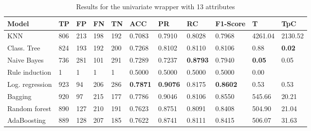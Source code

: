 \documentclass[a4paper,11pt]{article}
\begin{document}
\begin{table}
\centering
\begin{tabular}{|l|l|l|l|l|l|l|l|l|l|l|}
\hline

\textbf{Model} & \textbf{TP} & \textbf{FP} & \textbf{FN} & \textbf{TN} & \textbf{ACC} & \textbf{PR} & \textbf{RC} & \textbf{F1-Score} & \textbf{T} & \textbf{TpC} \\ \hline
KNN & 806 & 213 & 198 & 192 & 0.7083 & 0.7910 & 0.8028 & 0.7968 & 4261.04 & 2130.52 \\ \hline
Class. Tree & 824 & 193 & 192 & 200 & 0.7268 & 0.8102 & 0.8110 & 0.8106 & 0.88 & \textbf{0.02} \\ \hline
Naive Bayes & 736 & 281 & 101 & 291 & 0.7289 & 0.7237 & \textbf{0.8793} & 0.7940 & \textbf{0.05} & 0.05 \\ \hline
Rule induction & 1 & 1 & 1 & 1 & 0.5000 & 0.5000 & 0.5000 & 0.5000 & 0.00 \\ \hline
Log. regression & 923 & 94 & 206 & 286 & \textbf{0.7871} & \textbf{0.9076} & 0.8175 & \textbf{0.8602} & 0.53 & 0.53 \\ \hline
Bagging & 920 & 97 & 215 & 177 & 0.7786 & 0.9046 & 0.8106 & 0.8550 & 545.66 & 20.21 \\ \hline
Random forest & 890 & 127 & 210 & 191 & 0.7623 & 0.8751 & 0.8091 & 0.8408 & 504.90 & 21.04 \\ \hline
AdaBoosting & 889 & 128 & 207 & 185 & 0.7622 & 0.8741 & 0.8111 & 0.8415 & 506.07 & 31.63 \\ \hline

\end{tabular}
\caption{Results for the univariate wrapper with 13 attributes}
\label{class:w50u}
\end{table}
\end{document}
